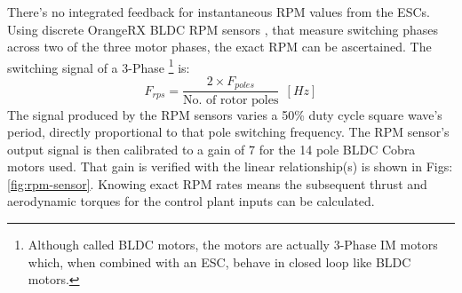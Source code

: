 There's no integrated feedback for instantaneous RPM values from the ESCs. Using discrete OrangeRX BLDC RPM sensors \cite{orangerpm}, that measure switching phases across two of the three motor phases, the exact RPM can be ascertained. The switching signal of a 3-Phase \footnote{Although called BLDC motors, the motors are actually 3-Phase IM motors which, when combined with an ESC, behave in closed loop like BLDC motors.} is:
\begin{equation}
F_{rps}=\frac{2\times F_{poles}}{\text{No. of rotor poles}}~~[Hz]
\end{equation}
The signal produced by the RPM sensors varies a 50\% duty cycle square wave's period, directly proportional to that pole switching frequency. The RPM sensor's output signal is then calibrated to a gain of 7 for the 14 pole BLDC Cobra motors used. That gain is verified with the linear relationship(s) is shown in Figs:\ref{fig:rpm-sensor}. Knowing exact RPM rates means the subsequent thrust and aerodynamic torques for the control plant inputs can be calculated.
\newpage
